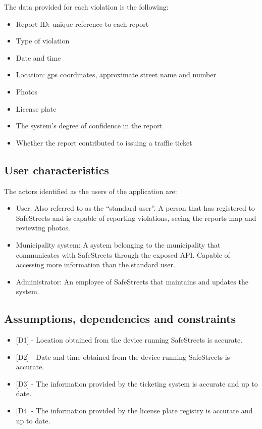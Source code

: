 The data provided for each violation is the following:
\begin{itemize}
\item Report ID: unique reference to each report
\item Type of violation
\item Date and time
\item Location: gps coordinates, approximate street name and number
\item Photos
\item License plate
\item The system’s degree of confidence in the report
\item Whether the report contributed to issuing a traffic ticket
\end{itemize}


\subsection{User characteristics}
The actors identified as the users of the application are:
\begin{itemize}
\item
User: Also referred to as the “standard user”. A person that has registered to SafeStreets and is capable of reporting violations, seeing the reports map and reviewing photos. 
\item
Municipality system: A system belonging to the municipality that communicates with SafeStreets through the exposed API. Capable of accessing more information than the standard user.
\item
Administrator: An employee of SafeStreets that maintains and updates the system.
\end{itemize}

\subsection{Assumptions, dependencies and constraints}

\newcommand{\assumptionLocation}{
    {[D1]} - Location obtained from the device running SafeStreets is accurate.
}
\newcommand{\assumptionDateTime}{
    {[D2]} - Date and time obtained from the device running SafeStreets is accurate. 
}
\newcommand{\assumptionTicketingInfo}{
    {[D3]} - The information provided by the ticketing system is accurate and up to date. 
}
\newcommand{\assumptionLicensePlateRegistry}{
    {[D4]} - The information provided by the license plate registry is accurate and up to date.
}

\begin{itemize}[label={}]
    \item \assumptionLocation{}
    \item \assumptionDateTime{}
    \item \assumptionTicketingInfo{}
    \item \assumptionLicensePlateRegistry{}
\end{itemize}